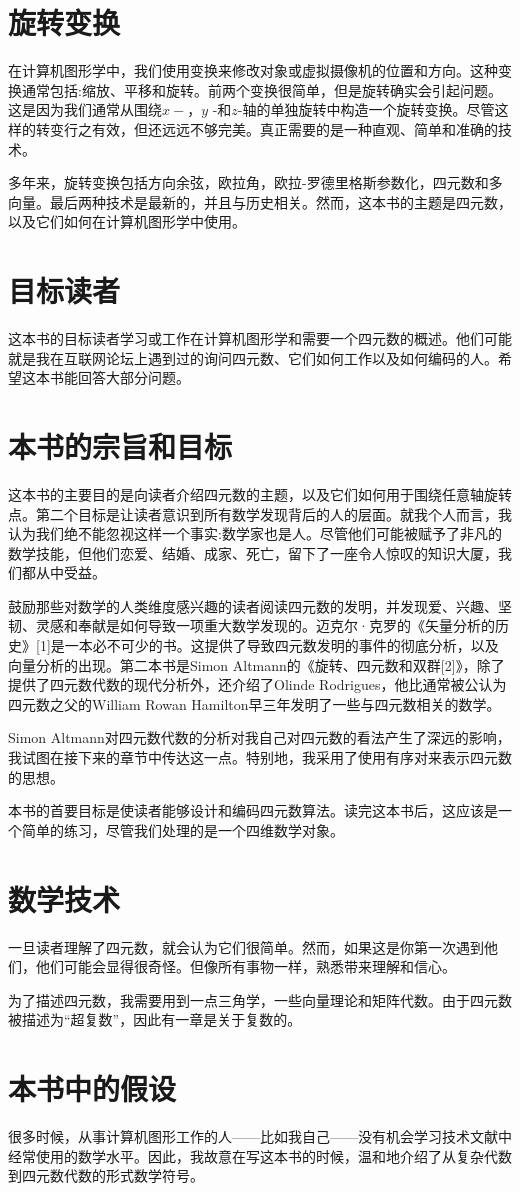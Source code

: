 
\section{旋转变换}
在计算机图形学中，我们使用变换来修改对象或虚拟摄像机的位置和方向。这种变换通常包括:缩放、平移和旋转。前两个变换很简单，但是旋转确实会引起问题。这是因为我们通常从围绕$x-， y$ -和$z$-轴的单独旋转中构造一个旋转变换。尽管这样的转变行之有效，但还远远不够完美。真正需要的是一种直观、简单和准确的技术。

多年来，旋转变换包括方向余弦，欧拉角，欧拉-罗德里格斯参数化，四元数和多向量。最后两种技术是最新的，并且与历史相关。然而，这本书的主题是四元数，以及它们如何在计算机图形学中使用。


\section{目标读者}
这本书的目标读者学习或工作在计算机图形学和需要一个四元数的概述。他们可能就是我在互联网论坛上遇到过的询问四元数、它们如何工作以及如何编码的人。希望这本书能回答大部分问题。


\section{本书的宗旨和目标}
这本书的主要目的是向读者介绍四元数的主题，以及它们如何用于围绕任意轴旋转点。第二个目标是让读者意识到所有数学发现背后的人的层面。就我个人而言，我认为我们绝不能忽视这样一个事实:数学家也是人。尽管他们可能被赋予了非凡的数学技能，但他们恋爱、结婚、成家、死亡，留下了一座令人惊叹的知识大厦，我们都从中受益。

鼓励那些对数学的人类维度感兴趣的读者阅读四元数的发明，并发现爱、兴趣、坚韧、灵感和奉献是如何导致一项重大数学发现的。迈克尔·克罗的《矢量分析的历史》[1]是一本必不可少的书。这提供了导致四元数发明的事件的彻底分析，以及向量分析的出现。第二本书是Simon Altmann的《旋转、四元数和双群[2]》，除了提供了四元数代数的现代分析外，还介绍了Olinde Rodrigues，他比通常被公认为四元数之父的William Rowan Hamilton早三年发明了一些与四元数相关的数学。

Simon Altmann对四元数代数的分析对我自己对四元数的看法产生了深远的影响，我试图在接下来的章节中传达这一点。特别地，我采用了使用有序对来表示四元数的思想。

本书的首要目标是使读者能够设计和编码四元数算法。读完这本书后，这应该是一个简单的练习，尽管我们处理的是一个四维数学对象。

\section{数学技术}
一旦读者理解了四元数，就会认为它们很简单。然而，如果这是你第一次遇到他们，他们可能会显得很奇怪。但像所有事物一样，熟悉带来理解和信心。

为了描述四元数，我需要用到一点三角学，一些向量理论和矩阵代数。由于四元数被描述为“超复数”，因此有一章是关于复数的。


\section{本书中的假设}
很多时候，从事计算机图形工作的人——比如我自己——没有机会学习技术文献中经常使用的数学水平。因此，我故意在写这本书的时候，温和地介绍了从复杂代数到四元数代数的形式数学符号。

